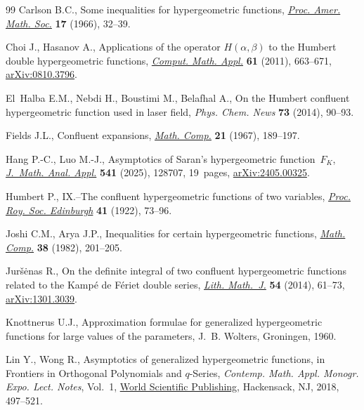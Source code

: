 \documentclass[pdftex]{sigma}
\numberwithin{equation}{section}
\begin{document}
\begin{thebibliography}{99}
Carlson B.C., Some inequalities for hypergeometric functions, \href{https://doi.org/10.2307/2035056}{\textit{Proc.
 Amer. Math. Soc.}} \textbf{17} (1966), 32--39.

Choi J., Hasanov A., Applications of the operator {$H(\alpha,\beta)$} to the
 {H}umbert double hypergeometric functions, \href{https://doi.org/10.1016/j.camwa.2010.12.012}{\textit{Comput. Math. Appl.}}
 \textbf{61} (2011), 663--671, \href{https://arxiv.org/abs/0810.3796}{arXiv:0810.3796}.

El~Halba E.M., Nebdi H., Boustimi M., Belafhal A., On the {H}umbert confluent
 hypergeometric function used in laser field, \textit{Phys. Chem. News}
 \textbf{73} (2014), 90--93.

Fields J.L., Confluent expansions, \href{https://doi.org/10.2307/2004159}{\textit{Math. Comp.}} \textbf{21} (1967),
 189--197.

Hang P.-C., Luo M.-J., Asymptotics of {S}aran's hypergeometric function~$F_K$,
 \href{https://doi.org/10.1016/j.jmaa.2024.128707}{\textit{J.~Math. Anal. Appl.}} \textbf{541} (2025), 128707, 19~pages,
 \href{https://arxiv.org/abs/2405.00325}{arXiv:2405.00325}.

Humbert P., {IX}.--{T}he confluent hypergeometric functions of two variables,
 \href{https://doi.org/10.1017/S0370164600009810}{\textit{Proc. Roy. Soc. Edinburgh}} \textbf{41} (1922), 73--96.

Joshi C.M., Arya J.P., Inequalities for certain hypergeometric functions,
 \href{https://doi.org/10.2307/2007475}{\textit{Math. Comp.}} \textbf{38} (1982), 201--205.

Jur\v{s}\.enas R., On the definite integral of two confluent hypergeometric
 functions related to the {K}amp\'e de {F}\'eriet double series, \href{https://doi.org/10.1007/s10986-014-9227-y}{\textit{Lith.
 Math.~J.}} \textbf{54} (2014), 61--73, \href{https://arxiv.org/abs/1301.3039}{arXiv:1301.3039}.

Knottnerus U.J., Approximation formulae for generalized hypergeometric
 functions for large values of the parameters, J.~B. Wolters, Groningen, 1960.

Lin Y., Wong R., Asymptotics of generalized hypergeometric functions, in
 Frontiers in Orthogonal Polynomials and {$q$}-Series, \textit{Contemp. Math.
 Appl. Monogr. Expo. Lect. Notes}, Vol.~1, \href{https://doi.org/10.1142/9789813228887_0025}{World Scientific Publishing},
 Hackensack, NJ, 2018, 497--521.


\end{thebibliography}
\end{document}

